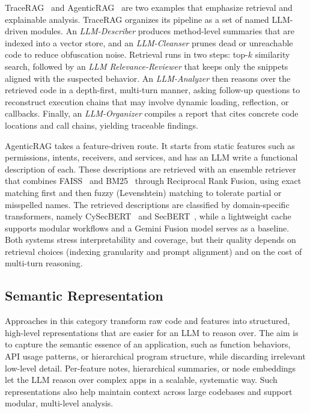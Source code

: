 TraceRAG~\cite{Zhang2025-ot} and AgenticRAG~\cite{S2025-kj} are two examples that emphasize retrieval and explainable analysis. TraceRAG organizes its pipeline as a set of named LLM-driven modules. An \emph{LLM-Describer} produces method-level summaries that are indexed into a vector store, and an \emph{LLM-Cleanser} prunes dead or unreachable code to reduce obfuscation noise. Retrieval runs in two steps: top-$k$ similarity search, followed by an \emph{LLM Relevance-Reviewer} that keeps only the snippets aligned with the suspected behavior. An \emph{LLM-Analyzer} then reasons over the retrieved code in a depth-first, multi-turn manner, asking follow-up questions to reconstruct execution chains that may involve dynamic loading, reflection, or callbacks. Finally, an \emph{LLM-Organizer} compiles a report that cites concrete code locations and call chains, yielding traceable findings.

AgenticRAG takes a feature-driven route. It starts from static features such as permissions, intents, receivers, and services, and has an LLM write a functional description of each. These descriptions are retrieved with an ensemble retriever that combines FAISS~\cite{faiss_lib} and BM25~\cite{Robertson2009} through Reciprocal Rank Fusion, using exact matching first and then fuzzy (Levenshtein) matching to tolerate partial or misspelled names. The retrieved descriptions are classified by domain-specific transformers, namely CySecBERT~\cite{Bayer2024} and SecBERT~\cite{Huang2024}, while a lightweight cache supports modular workflows and a Gemini Fusion model serves as a baseline. Both systems stress interpretability and coverage, but their quality depends on retrieval choices (indexing granularity and prompt alignment) and on the cost of multi-turn reasoning.

\subsection{Semantic Representation}
Approaches in this category transform raw code and features into structured, high-level representations that are easier for an LLM to reason over. The aim is to capture the semantic essence of an application, such as function behaviors, API usage patterns, or hierarchical program structure, while discarding irrelevant low-level detail. Per-feature notes, hierarchical summaries, or node embeddings let the LLM reason over complex apps in a scalable, systematic way. Such representations also help maintain context across large codebases and support modular, multi-level analysis.

